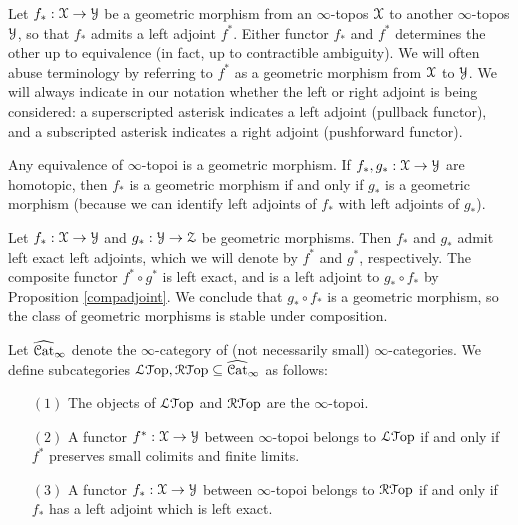 \begin{remark}
Let $f_{\ast}: \operatorname{\mathcal{X}} \rightarrow \operatorname{\mathcal{Y}}$ be a geometric morphism from an $\infty$-topos $\operatorname{\mathcal{X}}$ to another $\infty$-topos $\operatorname{\mathcal{Y}}$, so that $f_{\ast}$ admits a left adjoint $f^{\ast}$. 
Either functor $f_{\ast}$ and $f^{\ast}$ determines the other up to equivalence (in fact, up to contractible ambiguity). We will often abuse terminology by referring to $f^{\ast}$ as a geometric morphism from $\operatorname{\mathcal{X}}$ to $\operatorname{\mathcal{Y}}$. We will always indicate in our notation whether the left or right adjoint is being considered: a superscripted asterisk indicates a left adjoint (pullback functor), and a subscripted asterisk indicates a right adjoint (pushforward functor).
\end{remark}

\begin{remark}
Any equivalence of $\infty$-topoi is a geometric morphism. If $f_{\ast}, g_{\ast}: \operatorname{\mathcal{X}} \rightarrow \operatorname{\mathcal{Y}}$ are homotopic, then $f_{\ast}$ is a geometric morphism if and only if $g_{\ast}$ is a geometric morphism (because we can identify left adjoints of $f_{\ast}$ with left adjoints of $g_{\ast}$). 
\end{remark}

\begin{remark}
Let $f_{\ast}: \operatorname{\mathcal{X}} \rightarrow \operatorname{\mathcal{Y}}$ and $g_{\ast}: \operatorname{\mathcal{Y}} \rightarrow \operatorname{\mathcal{Z}}$ be geometric morphisms. Then $f_{\ast}$ and $g_{\ast}$ admit left exact left adjoints, which we will denote by
$f^{\ast}$ and $g^{\ast}$, respectively. The composite functor $f^{\ast} \circ g^{\ast}$ is left
exact, and is a left adjoint to $g_{\ast} \circ f_{\ast}$ by Proposition \ref{compadjoint}. We conclude that $g_{\ast} \circ f_{\ast}$ is a geometric morphism, so the class of geometric morphisms is stable under composition.
\end{remark}

\begin{definition}
Let $\widehat{\operatorname{\mathcal{C}at}}_{\infty}$ denote the $\infty$-category of (not necessarily small) $\infty$-categories. We define subcategories $\operatorname{\mathcal{L}{\mathcal T}op}, \operatorname{\mathcal{R}{\mathcal T}op} \subseteq \widehat{\operatorname{\mathcal{C}at}}_{\infty}$ as follows:
\begin{itemize}
\item[$(1)$] The objects of $\operatorname{\mathcal{L}{\mathcal T}op}$ and $\operatorname{\mathcal{R}{\mathcal T}op}$ are the $\infty$-topoi.
\item[$(2)$] A functor $f^{\ast}: \operatorname{\mathcal{X}} \rightarrow \operatorname{\mathcal{Y}}$ between $\infty$-topoi belongs to
$\operatorname{\mathcal{L}{\mathcal T}op}$ if and only if $f^{\ast}$ preserves small colimits and finite limits.
\item[$(3)$] A functor $f_{\ast}: \operatorname{\mathcal{X}} \rightarrow \operatorname{\mathcal{Y}}$ between $\infty$-topoi belongs to
$\operatorname{\mathcal{R}{\mathcal T}op}$ if and only if $f_{\ast}$ has a left adjoint which is left exact.
\end{itemize}
\end{definition}

